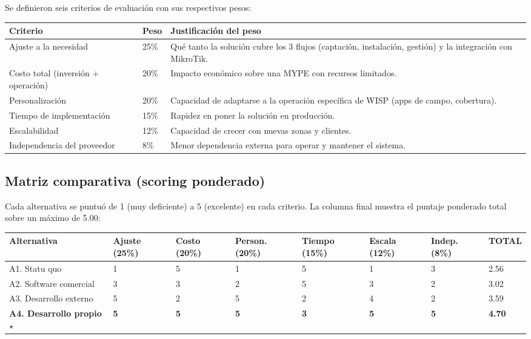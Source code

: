 Se definieron seis criterios de evaluación con sus respectivos pesos:

\begin{center}
\label{tab:criterios}
\begin{tabularx}{\textwidth}{L{3.6cm} C{1.2cm} X}
\toprule
\textbf{Criterio} & \textbf{Peso} & \textbf{Justificación del peso} \\
\midrule
Ajuste a la necesidad & 25\% &
Qué tanto la solución cubre los 3 flujos (captación, instalación, gestión) y la
integración con MikroTik. \\
Costo total (inversión $+$ operación) & 20\% &
Impacto económico sobre una MYPE con recursos limitados. \\
Personalización & 20\% &
Capacidad de adaptarse a la operación específica de WISP (apps de campo, cobertura). \\
Tiempo de implementación & 15\% &
Rapidez en poner la solución en producción. \\
Escalabilidad & 12\% &
Capacidad de crecer con nuevas zonas y clientes. \\
Independencia del proveedor & 8\% &
Menor dependencia externa para operar y mantener el sistema. \\
\bottomrule
\end{tabularx}
\end{center}

\subsection{Matriz comparativa (scoring ponderado)}

Cada alternativa se puntuó de 1 (muy deficiente) a 5 (excelente) en cada criterio.
La columna final muestra el puntaje ponderado total sobre un máximo de 5.00:

\begin{center}
\label{tab:scoring}
{\small
\begin{tabularx}{\textwidth}{X C{1.05cm} C{1.05cm} C{1.05cm} C{1.05cm} C{1.05cm} C{1.05cm} C{1.1cm}}
\toprule
\textbf{Alternativa} & \textbf{Ajuste (25\%)} & \textbf{Costo (20\%)} &
\textbf{Person. (20\%)} & \textbf{Tiempo (15\%)} & \textbf{Escala (12\%)} &
\textbf{Indep. (8\%)} & \textbf{TOTAL} \\
\midrule
A1. Statu quo            & 1 & 5 & 1 & 5 & 1 & 3 & 2.56 \\
A2. Software comercial   & 3 & 3 & 2 & 5 & 3 & 2 & 3.02 \\
A3. Desarrollo externo   & 5 & 2 & 5 & 2 & 4 & 2 & 3.59 \\
\textbf{A4. Desarrollo propio} $\star$ & \textbf{5} & \textbf{5} & \textbf{5} &
\textbf{3} & \textbf{5} & \textbf{5} & \textbf{4.70} \\
\bottomrule
\end{tabularx}
}
\end{center}

